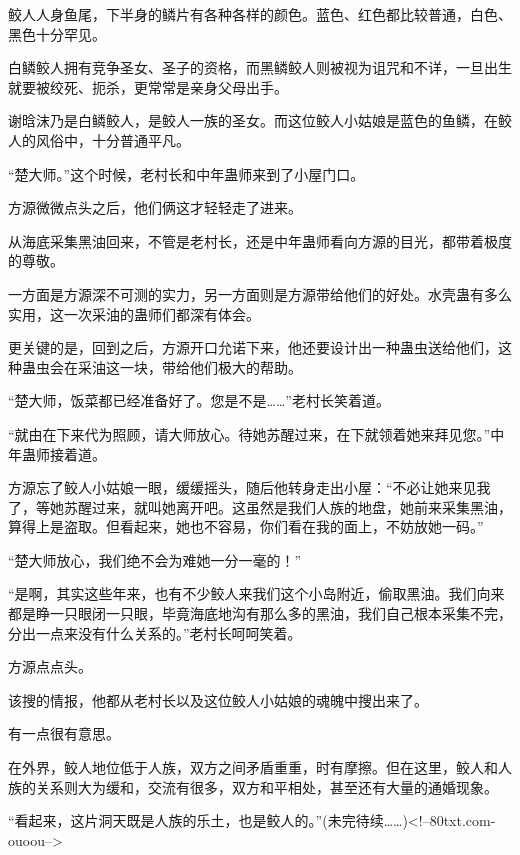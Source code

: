 \begin{this_body}
鲛人人身鱼尾，下半身的鳞片有各种各样的颜色。蓝色、红色都比较普通，白色、黑色十分罕见。

白鳞鲛人拥有竞争圣女、圣子的资格，而黑鳞鲛人则被视为诅咒和不详，一旦出生就要被绞死、扼杀，更常常是亲身父母出手。

谢晗沫乃是白鳞鲛人，是鲛人一族的圣女。而这位鲛人小姑娘是蓝色的鱼鳞，在鲛人的风俗中，十分普通平凡。

“楚大师。”这个时候，老村长和中年蛊师来到了小屋门口。

方源微微点头之后，他们俩这才轻轻走了进来。

从海底采集黑油回来，不管是老村长，还是中年蛊师看向方源的目光，都带着极度的尊敬。

一方面是方源深不可测的实力，另一方面则是方源带给他们的好处。水壳蛊有多么实用，这一次采油的蛊师们都深有体会。

更关键的是，回到之后，方源开口允诺下来，他还要设计出一种蛊虫送给他们，这种蛊虫会在采油这一块，带给他们极大的帮助。

“楚大师，饭菜都已经准备好了。您是不是……”老村长笑着道。

“就由在下来代为照顾，请大师放心。待她苏醒过来，在下就领着她来拜见您。”中年蛊师接着道。

方源忘了鲛人小姑娘一眼，缓缓摇头，随后他转身走出小屋：“不必让她来见我了，等她苏醒过来，就叫她离开吧。这虽然是我们人族的地盘，她前来采集黑油，算得上是盗取。但看起来，她也不容易，你们看在我的面上，不妨放她一码。”

“楚大师放心，我们绝不会为难她一分一毫的！”

“是啊，其实这些年来，也有不少鲛人来我们这个小岛附近，偷取黑油。我们向来都是睁一只眼闭一只眼，毕竟海底地沟有那么多的黑油，我们自己根本采集不完，分出一点来没有什么关系的。”老村长呵呵笑着。

方源点点头。

该搜的情报，他都从老村长以及这位鲛人小姑娘的魂魄中搜出来了。

有一点很有意思。

在外界，鲛人地位低于人族，双方之间矛盾重重，时有摩擦。但在这里，鲛人和人族的关系则大为缓和，交流有很多，双方和平相处，甚至还有大量的通婚现象。

“看起来，这片洞天既是人族的乐土，也是鲛人的。”(未完待续……)<!--80txt.com-ouoou-->

\end{this_body}

